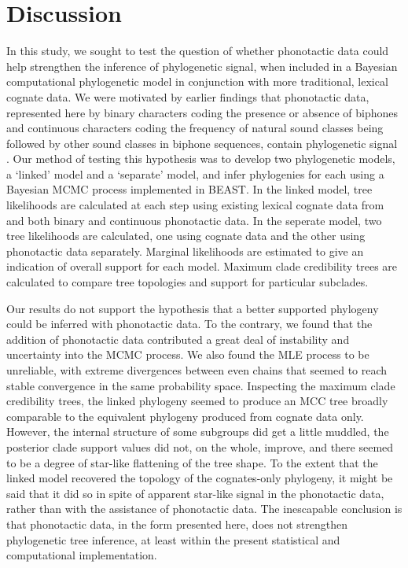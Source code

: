 \documentclass[]{article}
\begin{document}
\hypertarget{pn-tree-discussion}{%
\section{Discussion}\label{pn-tree-discussion}}

In this study, we sought to test the question of whether phonotactic data could help strengthen the inference of phylogenetic signal, when included in a Bayesian computational phylogenetic model in conjunction with more traditional, lexical cognate data. We were motivated by earlier findings that phonotactic data, represented here by binary characters coding the presence or absence of biphones and continuous characters coding the frequency of natural sound classes being followed by other sound classes in biphone sequences, contain phylogenetic signal \autocite{macklin-cordes_phylogenetic_2021}. Our method of testing this hypothesis was to develop two phylogenetic models, a `linked' model and a `separate' model, and infer phylogenies for each using a Bayesian MCMC process implemented in BEAST. In the linked model, tree likelihoods are calculated at each step using existing lexical cognate data from \textcite{bouckaert_origin_2018} and both binary and continuous phonotactic data. In the seperate model, two tree likelihoods are calculated, one using cognate data and the other using phonotactic data separately. Marginal likelihoods are estimated to give an indication of overall support for each model. Maximum clade credibility trees are calculated to compare tree topologies and support for particular subclades.

Our results do not support the hypothesis that a better supported phylogeny could be inferred with phonotactic data. To the contrary, we found that the addition of phonotactic data contributed a great deal of instability and uncertainty into the MCMC process. We also found the MLE process to be unreliable, with extreme divergences between even chains that seemed to reach stable convergence in the same probability space. Inspecting the maximum clade credibility trees, the linked phylogeny seemed to produce an MCC tree broadly comparable to the equivalent phylogeny produced from cognate data only. However, the internal structure of some subgroups did get a little muddled, the posterior clade support values did not, on the whole, improve, and there seemed to be a degree of star-like flattening of the tree shape. To the extent that the linked model recovered the topology of the cognates-only phylogeny, it might be said that it did so in spite of apparent star-like signal in the phonotactic data, rather than with the assistance of phonotactic data. The inescapable conclusion is that phonotactic data, in the form presented here, does not strengthen phylogenetic tree inference, at least within the present statistical and computational implementation.
\end{document}
